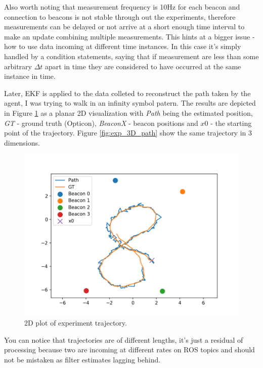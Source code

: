 Also worth noting that measurement frequency is 10Hz for each beacon and connection to beacons is not stable through out the experiments, therefore measurements can be delayed or not arrive at a short enough time interval to make an update combining multiple measurements. This hints at a bigger issue - how to use data incoming at different time instances. In this case it's simply handled by a condition statements, saying that if measurement are less than some arbitrary $\Delta t$ apart in time they are considered to have occurred at the same instance in time.

Later, EKF is applied to the data colleted to reconstruct the path taken by the agent, I was trying to walk in an infinity symbol patern. The results are depicted in Figure \ref{fig:exp_2d_path} as a planar 2D visualization with \emph{Path} being the estimated position, \emph{GT} - ground truth (Opticon), \emph{BeaconX} - beacon positions and \emph{$x0$} - the starting point of the trajectory. Figure \ref{fig:exp_3D_path} show the same trajectory in 3 dimensions.
\begin{figure}[H]
    \centering
    \includegraphics[width=\linewidth]{figures/2d_path.png}
    \caption{2D plot of experiment trajectory.}
    \label{fig:exp_2d_path}
\end{figure}

You can notice that trajectories are of different lengths, it's just a residual of processing because two are incoming at different rates on ROS topics and should not be mistaken as filter estimates lagging behind.

